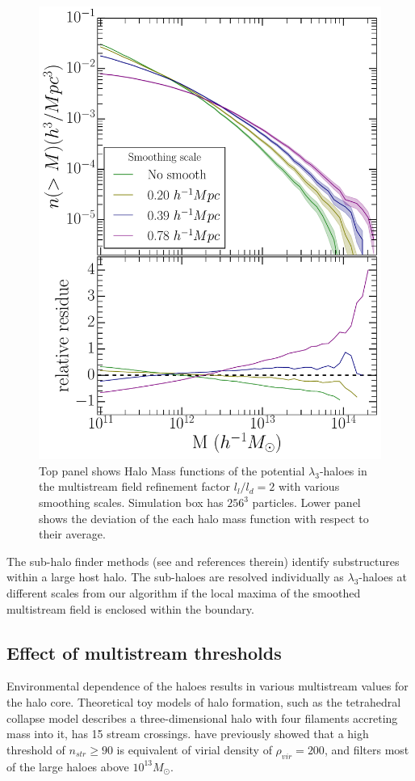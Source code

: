 {\begin{figure}
\begin{minipage}[t]{.99\linewidth}
 \centering\includegraphics[width=10.cm]{Chapter5/Source_v2/fig6.pdf} 
\end{minipage}\hfill
\caption{Top panel shows Halo Mass functions of the potential $\lambda_3$-haloes in the multistream field refinement factor $l_l/l_d = 2$ with various smoothing scales. Simulation box has $256^3$ particles. Lower panel shows the deviation of the each halo mass function with respect to their average.}
\label{fig:hmfSmooth}
\end{figure}

The sub-halo finder methods (see \citealt{Onions2012} and references therein) identify substructures within a large host halo. The sub-haloes are resolved individually as $\lambda_3$-haloes at different scales from our algorithm if the local maxima of the smoothed multistream field is enclosed within the boundary.  




\subsection{Effect of multistream thresholds}
\label{sub:multiThresholds}


Environmental dependence of the haloes results in various multistream values for the halo core. Theoretical toy models of halo formation, such as the tetrahedral collapse model \cite{Neyrinck2016} describes a three-dimensional halo with four filaments accreting mass into it, has 15 stream crossings.  
\cite{Ramachandra2015} have previously showed that a high threshold of $n_{str} \geq 90$ is equivalent of virial density of $\rho_{vir} = 200$, and filters most of the large haloes above $10^{13} M_{\odot}$. 

}
